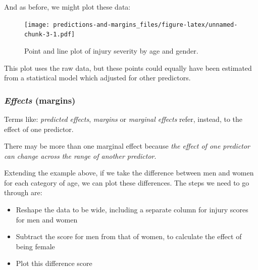 \documentclass[]{article}
\providecommand{\tightlist}{%
  \setlength{\itemsep}{0pt}\setlength{\parskip}{0pt}}
\theoremstyle{definition}
\theoremstyle{definition}
\theoremstyle{definition}
\theoremstyle{remark}
\begin{document}
And as before, we might plot these data:

\begin{figure}
\centering
\texttt{[image: predictions-and-margins\_files/figure-latex/unnamed-chunk-3-1.pdf]}
\caption{\label{fig:unnamed-chunk-3}Point and line plot of injury severity
by age and gender.}
\end{figure}

This plot uses the raw data, but these points could equally have been
estimated from a statistical model which adjusted for other predictors.

\subsubsection*{\texorpdfstring{\emph{Effects}
(margins)}{Effects (margins)}}\label{effects-margins}

Terms like: \emph{predicted effects}, \emph{margins} or \emph{marginal
effects} refer, instead, to the effect of one predictor.

There may be more than one marginal effect because \emph{the effect of
one predictor can change across the range of another predictor}.

Extending the example above, if we take the difference between men and
women for each category of age, we can plot these differences. The steps
we need to go through are:

\begin{itemize}
\tightlist
\item
  Reshape the data to be wide, including a separate column for injury
  scores for men and women
\item
  Subtract the score for men from that of women, to calculate the effect
  of being female
\item
  Plot this difference score
\end{itemize}
\end{document}
